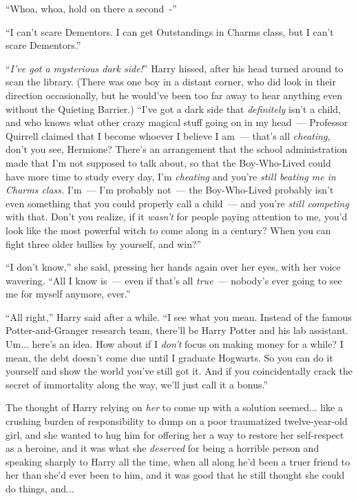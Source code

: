 ``Whoa, whoa, hold on there a second~-''

``I can't scare Dementors. I can get Outstandings in Charms class, but I can't scare Dementors.''

``\emph{I've got a mysterious dark side!}'' Harry hissed, after his head turned around to scan the library. (There was one boy in a distant corner, who did look in their direction occasionally, but he would've been too far away to hear anything even without the Quieting Barrier.) ``I've got a dark side that \emph{definitely} isn't a child, and who knows what other crazy magical stuff going on in my head~--- Professor Quirrell claimed that I become whoever I believe I am~--- that's all \emph{cheating,} don't you see, Hermione? There's an arrangement that the school administration made that I'm not supposed to talk about, so that the Boy-Who-Lived could have more time to study every day, I'm \emph{cheating} and you're \emph{still beating me in Charms class.} I'm~--- I'm probably not~--- the Boy-Who-Lived probably isn't even something that you could properly call a child~--- and you're \emph{still competing} with that. Don't you realize, if it \emph{wasn't} for people paying attention to me, you'd look like the most powerful witch to come along in a century? When you can fight three older bullies by yourself, and win?''

``I don't know,'' she said, pressing her hands again over her eyes, with her voice wavering. ``All I know is~--- even if that's all \emph{true}~--- nobody's ever going to see me for myself anymore, ever.''

``All right,'' Harry said after a while. ``I see what you mean. Instead of the famous Potter-and-Granger research team, there'll be Harry Potter and his lab assistant. Um... here's an idea. How about if I \emph{don't} focus on making money for a while? I mean, the debt doesn't come due until I graduate Hogwarts. So you can do it yourself and show the world you've still got it. And if you coincidentally crack the secret of immortality along the way, we'll just call it a bonus.''

The thought of Harry relying on \emph{her} to come up with a solution seemed... like a crushing burden of responsibility to dump on a poor traumatized twelve-year-old girl, and she wanted to hug him for offering her a way to restore her self-respect as a heroine, and it was what she \emph{deserved} for being a horrible person and speaking sharply to Harry all the time, when all along he'd been a truer friend to her than she'd ever been to him, and it was good that he still thought she could do things, and...

